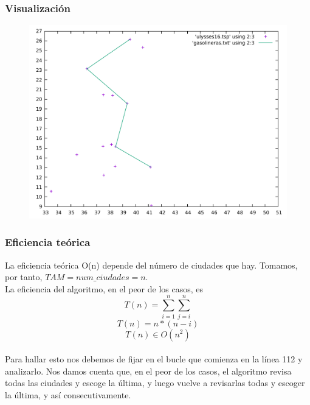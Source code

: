 \documentclass[11pt,a4paper]{article} %
\begin{document}
\subsubsection{Visualización}
\begin{figure}[H]
	\centering
	\includegraphics[width=13cm]{data/graphics/gasolineras/gasolineras.pdf}
\end{figure}

\subsubsection{Eficiencia teórica}
La eficiencia teórica O(n) depende del número de ciudades que hay. Tomamos, por tanto, $TAM = num\_ciudades = n$.\\

La eficiencia del algoritmo, en el peor de los casos, es 
$$T(n) = \sum_{i=1}^{n}\sum_{j=i}^{n}$$
$$T(n) = n*(n-i)$$
$$T(n) \in O(n^2)$$\\

Para hallar esto nos debemos de fijar en el bucle que comienza en la línea 112 y analizarlo. Nos damos cuenta que, en el peor de los casos, el algoritmo revisa todas las ciudades y escoge la última, y luego vuelve a revisarlas todas y escoger la última, y así consecutivamente.



\end{document}
